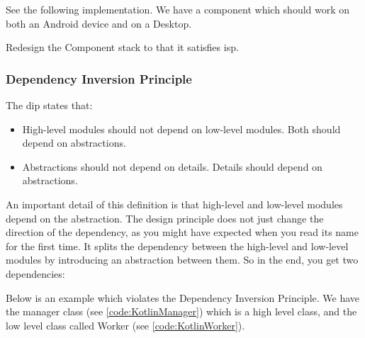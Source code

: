 See the following implementation.
We have a component which should work on both an Android device and on a Desktop. 







\begin{exercise}
	Redesign the Component stack to that it satisfies \gls{isp}.
\end{exercise}


\subsubsection{Dependency Inversion Principle}

\begin{framed}
	The \gls{dip} states that:
	\begin{itemize}
		\item High-level modules should not depend on low-level modules.
			Both should depend on abstractions.
		\item Abstractions should not depend on details.
			Details should depend on abstractions.
	\end{itemize}
\end{framed}

An important detail of this definition is that high-level and low-level modules depend on the abstraction.
The design principle does not just change the direction of the dependency, as you might have expected when you read its name for the first time.
It splits the dependency between the high-level and low-level modules by introducing an abstraction between them.
So in the end, you get two dependencies:

Below is an example which violates the Dependency Inversion Principle.
We have the manager class  (see \ref{code:KotlinManager}) which is a high level class, and the low level class called Worker (see \ref{code:KotlinWorker}).





